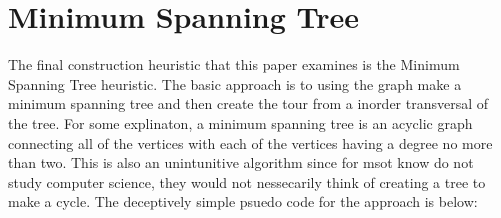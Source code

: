 \documentclass[midd]{thesis}
\newcommand{\tab}{\hspace*{2em}}
\begin{document}
\section{Minimum Spanning Tree}
\tab The final construction heuristic that this paper examines is the Minimum Spanning Tree heuristic. The basic approach is to using the graph make a minimum spanning tree and then create the tour from a inorder transversal of the tree. For some explinaton, a minimum spanning tree is an acyclic graph connecting all of the vertices with each of the vertices having a degree no more than two. This is also an unintunitive algorithm since for msot know do not study computer science, they would not nessecarily think of creating a tree to make a cycle. The deceptively simple psuedo code for the approach is below:\\
\end{document}
